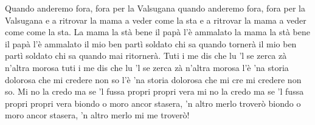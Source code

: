 \beginverse
Quando anderemo fora, fora per la Valsugana
quando anderemo fora, fora per la Valsugana
e a ritrovar la mama a veder come la sta
e a ritrovar la mama a veder come come la sta.
\endverse
\beginverse
La mama la stà bene il papà l'è ammalato
la mama la stà bene il papà l'è ammalato
il mio ben partì soldato chi sa quando tornerà
il mio ben partì soldato chi sa quando mai ritornerà.
\endverse
\beginverse
Tuti i me dis che lu 'l se zerca zà n'altra morosa
tuti i me dis che lu 'l se zerca zà n'altra morosa
l'è 'na storia dolorosa che mi credere non so
l'è 'na storia dolorosa che mi cre mi credere non so.
\endverse
\beginverse
Mi no la credo ma se 'l fussa propri propri vera
mi no la credo ma se 'l fussa propri propri vera
biondo o moro ancor stasera, 'n altro merlo troverò
biondo o moro ancor stasera, 'n altro merlo mi me troverò!
\endverse
\endsong